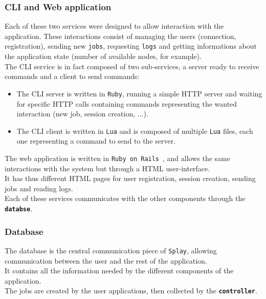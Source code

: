 \documentclass{eplmastersthesis}
\begin{document}
        \subsubsection{CLI and Web application}

          Each of these two services were designed to allow interaction
          with the application. These interactions consist of managing the users
          (connection, registration), sending new \texttt{jobs},
          requesting \texttt{logs} and getting informations
          about the application state (number of available nodes, for example).\\

          The CLI service is in fact composed of two sub-services, a server
          ready to receive commands and a client to send commands:
          \begin{itemize}
            \item The CLI server is written in \texttt{Ruby}, running a simple
            HTTP server and waiting for specific HTTP calls containing
            commands representing the wanted interaction (new job, session
            creation, ...).
            \item The CLI client is written in \texttt{Lua} and is composed of
            multiple \texttt{Lua} files, each one representing a command to send
            to the server.
          \end{itemize}

          The web application is written in \texttt{Ruby on Rails}~\cite{ror}, and
          allows the same interactions with the system but through
          a HTML user-interface.\\
          It has thus different HTML pages for user registration, session
          creation, sending jobs and reading logs.\\

          Each of these services communicates with the other components %
          through the \textbf{\texttt{databse}}.

        \subsubsection{Database}

          The database is the central communication piece of \texttt{Splay},
          allowing communication between the user and the rest of the %
          application.\\
          It contains all the information needed by the different components
          of the application.\\
          The jobs are created by the user applications, then collected by the %
          \textbf{\texttt{controller}}.\\
\end{document}
